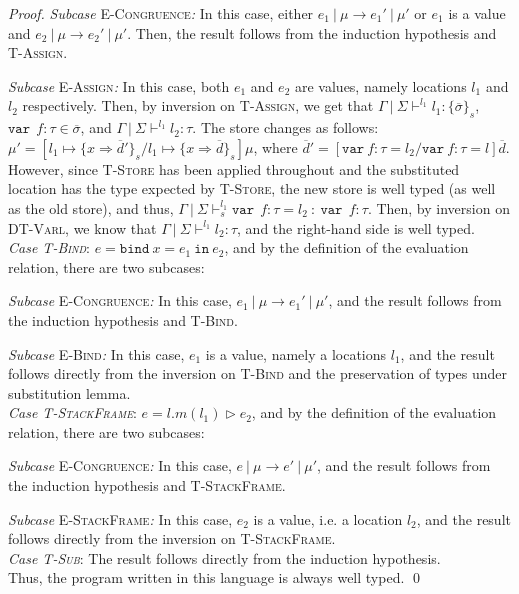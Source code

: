 \documentclass{llncs}
\newcommand{\keywadj}[1]{\mathtt{#1}}
\newcommand{\keyw}[1]{\keywadj{#1}~}
\begin{document}
\begin{proof}
\textit{Subcase} \textsc{E-Congruence}\textit{:} In this case, either $e_1~|~\mu \longrightarrow e_1'~|~\mu'$ or $e_1$ is a value and $e_2~|~\mu \longrightarrow e_2'~|~\mu'$. Then, the result follows from the induction hypothesis and \textsc{T-Assign}.

\textit{Subcase} \textsc{E-Assign}\textit{:} In this case, both $e_1$ and $e_2$ are values, namely locations $l_1$ and $l_2$ respectively. Then, by inversion on \textsc{T-Assign}, we get that $\Gamma~|~\Sigma \vdash^{l_1} l_1 : \{ \overline{\sigma} \}_s$, $\keyw{var}~ f : \tau \in \overline{\sigma}$, and $\Gamma~|~\Sigma \vdash^{l_1} l_2 : \tau$. The store changes as follows: $\mu' = [l_1 \mapsto \{ x \Rightarrow \overline{d}' \}_{s}/l_1 \mapsto \{ x \Rightarrow \overline{d} \}_{s}]\mu$, where $\overline{d}' = [\keyw{var} f:\tau = l_2/\keyw{var} f : \tau = l]\overline{d}$. However, since \textsc{T-Store} has been applied throughout and the substituted location has the type expected by \textsc{T-Store}, the new store is well typed (as well as the old store), and thus, \mbox{$\Gamma~|~\Sigma \vdash^{l_1}_s \keyw{var}~ f : \tau = l_2~:~\keyw{var}~ f : \tau$}. Then, by inversion on \textsc{DT-Varl}, we know that $\Gamma~|~\Sigma \vdash^{l_1} l_2 : \tau$, and the right-hand side is well typed.
\\

\noindent\textit{Case \textsc{T-Bind}}:
$e = \keyw{bind} x = e_1~\keyw{in} e_2$, and by the definition of the evaluation relation, there are two subcases:

\textit{Subcase} \textsc{E-Congruence}\textit{:} In this case, $e_1~|~\mu \longrightarrow e_1'~|~\mu'$, and the result follows from the induction hypothesis and \textsc{T-Bind}.

\textit{Subcase} \textsc{E-Bind}\textit{:} In this case, $e_1$ is a value, namely a locations $l_1$, and the result follows directly from the inversion on \textsc{T-Bind} and the preservation of types under substitution lemma.
\\

\noindent\textit{Case \textsc{T-StackFrame}}:
$e = l.m(l_1) \rhd e_2$, and by the definition of the evaluation relation, there are two subcases:

\textit{Subcase} \textsc{E-Congruence}\textit{:} In this case, $e~|~\mu \longrightarrow e'~|~\mu'$, and the result follows from the induction hypothesis and \textsc{T-StackFrame}.

\textit{Subcase} \textsc{E-StackFrame}\textit{:} In this case, $e_2$ is a value, i.e. a location $l_2$, and the result follows directly from the inversion on \textsc{T-StackFrame}.
\\

\noindent\textit{Case \textsc{T-Sub}}:
The result follows directly from the induction hypothesis.
\\

\noindent Thus, the program written in this language is always well typed. \qed

\end{proof}
\end{document}
